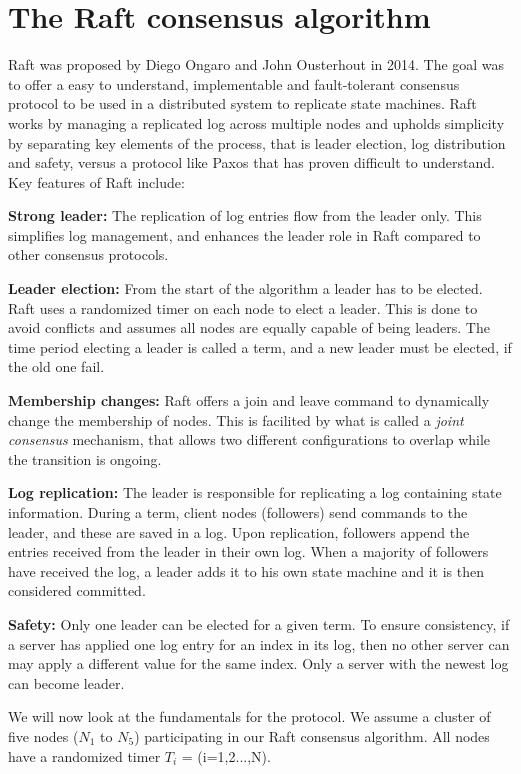 \section{The Raft consensus algorithm}

Raft was proposed by Diego Ongaro and John Ousterhout in 2014. The goal was to offer a easy to understand, implementable and fault-tolerant consensus protocol to be used in a distributed system to replicate state machines. Raft works by managing a replicated log across multiple nodes and upholds simplicity by separating key elements of the process, that is leader election, log distribution and safety, versus a protocol like Paxos that has proven difficult to understand. Key features of Raft include:

\noindent \textbf{Strong leader:} The replication of log entries flow from the leader only. This simplifies log management, and enhances the leader role in Raft compared to other consensus protocols.

\noindent \textbf{Leader election:} From the start of the algorithm a leader has to be elected. Raft uses a randomized timer on each node to elect a leader. This is done to avoid conflicts and assumes all nodes are equally capable of being leaders. The time period electing a leader is called a term, and a new leader must be elected, if the old one fail.

\noindent \textbf{Membership changes:} Raft offers a join and leave command to dynamically change the membership of nodes. This is facilited by what is called a \textit{joint consensus} mechanism, that allows two different configurations to overlap while the transition is ongoing.

\noindent \textbf{Log replication:} The leader is responsible for replicating a log containing state information. During a term, client nodes (followers) send commands to the leader, and these are saved in a log. Upon replication, followers append the entries received from the leader in their own log. When a majority of followers have received the log, a leader adds it to his own state machine and it is then considered committed.

\noindent \textbf{Safety:} Only one leader can be elected for a given term. To ensure consistency, if a server has applied one log entry for an index in its log, then no other server can may apply a different value for the same index. Only a server with the newest log can become leader.

\noindent We will now look at the fundamentals for the protocol. We assume a cluster of five nodes ($N_1$ to $N_5$) participating in our Raft consensus algorithm. All nodes have a randomized timer $T_i$ = (i=1,2...,N).


